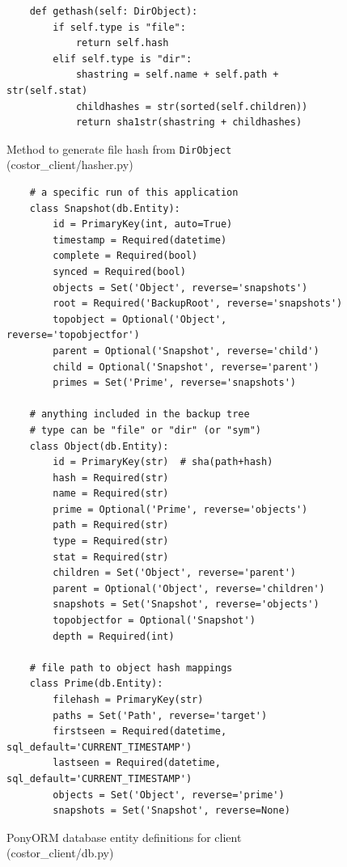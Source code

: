 \documentclass[bsc,frontabs,twoside,singlespacing,parskip,deptreport]{infthesis}     %
\begin{document}
\begin{figure}
	\begin{verbatim}
	def gethash(self: DirObject):
        if self.type is "file":
            return self.hash
        elif self.type is "dir":
            shastring = self.name + self.path + str(self.stat)
            childhashes = str(sorted(self.children))
            return sha1str(shastring + childhashes)
	\end{verbatim}
	\caption{Method to generate file hash from \texttt{DirObject} (costor\_client/hasher.py)}
	\label{fig:dirobjgethash}
\end{figure}

\begin{figure}
	\begin{verbatim}
    # a specific run of this application
    class Snapshot(db.Entity):
        id = PrimaryKey(int, auto=True)
        timestamp = Required(datetime)
        complete = Required(bool)
        synced = Required(bool)
        objects = Set('Object', reverse='snapshots')
        root = Required('BackupRoot', reverse='snapshots')
        topobject = Optional('Object', reverse='topobjectfor')
        parent = Optional('Snapshot', reverse='child')
        child = Optional('Snapshot', reverse='parent')
        primes = Set('Prime', reverse='snapshots')
    
    # anything included in the backup tree
    # type can be "file" or "dir" (or "sym")
    class Object(db.Entity):
        id = PrimaryKey(str)  # sha(path+hash)
        hash = Required(str)
        name = Required(str)
        prime = Optional('Prime', reverse='objects')
        path = Required(str)
        type = Required(str)
        stat = Required(str)
        children = Set('Object', reverse='parent')
        parent = Optional('Object', reverse='children')
        snapshots = Set('Snapshot', reverse='objects')
        topobjectfor = Optional('Snapshot')
        depth = Required(int)

    # file path to object hash mappings
    class Prime(db.Entity):
        filehash = PrimaryKey(str)
        paths = Set('Path', reverse='target')
        firstseen = Required(datetime, sql_default='CURRENT_TIMESTAMP')
        lastseen = Required(datetime, sql_default='CURRENT_TIMESTAMP')
        objects = Set('Object', reverse='prime')
        snapshots = Set('Snapshot', reverse=None)
	\end{verbatim}
	\caption{PonyORM database entity definitions for client (costor\_client/db.py)}
	\label{fig:clientmodels}
\end{figure}
\end{document}
